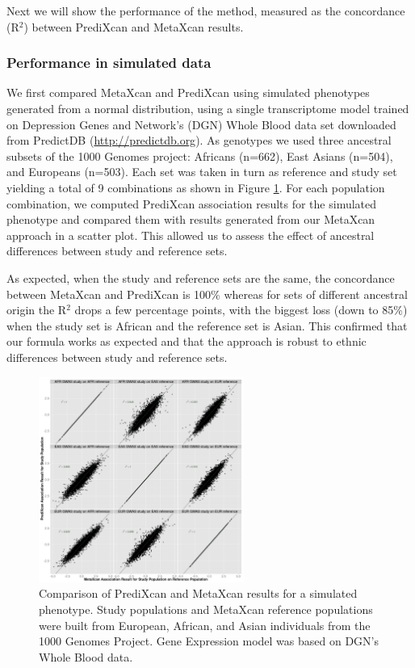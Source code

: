 \documentclass[10pt]{article}
\begin{document}
Next we will show the performance of the method, measured as the concordance (R$^2$) between PrediXcan and MetaXcan results.


\subsubsection*{Performance in simulated data}

We first compared MetaXcan and PrediXcan using simulated phenotypes generated from a normal distribution, using a single transcriptome model trained on Depression Genes and Network's (DGN) Whole Blood data set \cite{Battle2014} downloaded from PredictDB (\url{http://predictdb.org}). As genotypes we used three ancestral subsets of the 1000 Genomes project: Africans (n=662), East Asians (n=504), and Europeans (n=503). Each set was taken in turn as reference and study set yielding a total of 9 combinations as shown in Figure \ref{fig:simulatedgrid}. For each population combination, we computed PrediXcan association results for the simulated phenotype and compared them with results generated from our MetaXcan approach in a scatter plot. This allowed us to assess the effect of ancestral differences between study and reference sets.

As expected, when the study and reference sets are the same, the concordance between MetaXcan and PrediXcan is 100\% whereas for sets of different ancestral origin the R$^2$ drops a few percentage points, with the biggest loss (down to 85\%) when the study set is African and the reference set is Asian. This confirmed that our formula works as expected and that the approach is robust to ethnic differences between study and reference sets.

\begin{figure}
\includegraphics[width=0.6\textwidth]{plots/Fig3-simulated_grid.png}
\caption{Comparison of PrediXcan and MetaXcan results for a simulated phenotype. 
Study populations and MetaXcan reference populations were built from European, African, and Asian
individuals from the 1000 Genomes Project. Gene Expression model was based on DGN's Whole Blood data.
}
\label{fig:simulatedgrid}
\end{figure}
\end{document}
